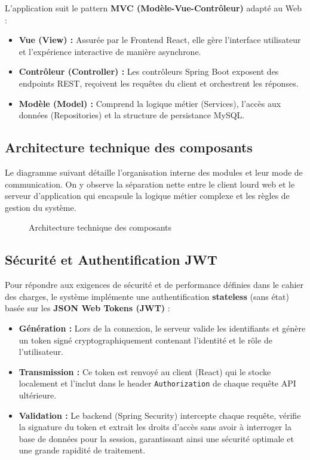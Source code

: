 \documentclass[12pt,a4paper]{article}
\begin{document}
L'application suit le pattern \textbf{MVC (Modèle-Vue-Contrôleur)} adapté au Web :
\begin{itemize}[label=\textcolor{primary}{\textbullet}]
    \item \textbf{Vue (View) :} Assurée par le Frontend React, elle gère l'interface utilisateur et l'expérience interactive de manière asynchrone.
    \item \textbf{Contrôleur (Controller) :} Les contrôleurs Spring Boot exposent des endpoints REST, reçoivent les requêtes du client et orchestrent les réponses.
    \item \textbf{Modèle (Model) :} Comprend la logique métier (Services), l'accès aux données (Repositories) et la structure de persistance MySQL.
\end{itemize}

\subsection{Architecture technique des composants}

Le diagramme suivant détaille l'organisation interne des modules et leur mode de communication. On y observe la séparation nette entre le client lourd web et le serveur d'application qui encapsule la logique métier complexe et les règles de gestion du système.

\begin{figure}[H]
    \centering
    \caption{Architecture technique des composants}
\end{figure}

\subsection{Sécurité et Authentification JWT}
\label{subsec:securite_jwt}

Pour répondre aux exigences de sécurité et de performance définies dans le cahier des charges, le système implémente une authentification \textbf{stateless} (sans état) basée sur les \textbf{JSON Web Tokens (JWT)} :

\begin{itemize}[label=\textcolor{primary}{\textbullet}]
    \item \textbf{Génération :} Lors de la connexion, le serveur valide les identifiants et génère un token signé cryptographiquement contenant l'identité et le rôle de l'utilisateur.
    \item \textbf{Transmission :} Ce token est renvoyé au client (React) qui le stocke localement et l'inclut dans le header \texttt{Authorization} de chaque requête API ultérieure.
    \item \textbf{Validation :} Le backend (Spring Security) intercepte chaque requête, vérifie la signature du token et extrait les droits d'accès sans avoir à interroger la base de données pour la session, garantissant ainsi une sécurité optimale et une grande rapidité de traitement.
\end{itemize}
\end{document}
